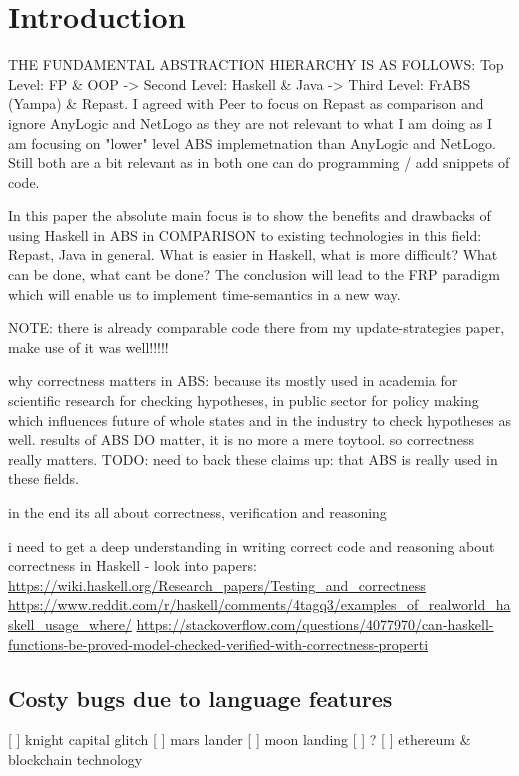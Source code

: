 \section{Introduction}

THE FUNDAMENTAL ABSTRACTION HIERARCHY IS AS FOLLOWS:
Top Level: FP \& OOP -> Second Level: Haskell \& Java -> Third Level: FrABS (Yampa) \& Repast.
I agreed with Peer to focus on Repast as comparison and ignore AnyLogic and NetLogo as they are not relevant to what I am doing as I am focusing on "lower" level ABS implemetnation than AnyLogic and NetLogo. Still both are a bit relevant as in both one can do programming / add snippets of code.


In this paper the absolute main focus is to show the benefits and drawbacks of using Haskell in ABS in COMPARISON to existing technologies in this field: Repast, Java in general. What is easier in Haskell, what is more difficult? What can be done, what cant be done?
The conclusion will lead to the FRP paradigm which will enable us to implement time-semantics in a new way.

NOTE: there is already comparable code there from my update-strategies paper, make use of it was well!!!!! 

why correctness matters in ABS: because its mostly used in academia for scientific research for checking hypotheses, in public sector for policy making which influences future of whole states and in the industry to check hypotheses as well. results of ABS DO matter, it is no more a mere toytool. so correctness really matters. TODO: need to back these claims up: that ABS is really used in these fields.

in the end its all about correctness, verification and reasoning
 
i need to get a deep understanding in writing correct code and reasoning about correctness in Haskell - look into papers:
\url{https://wiki.haskell.org/Research_papers/Testing_and_correctness}
\url{https://www.reddit.com/r/haskell/comments/4tagq3/examples_of_realworld_haskell_usage_where/}
\url{https://stackoverflow.com/questions/4077970/can-haskell-functions-be-proved-model-checked-verified-with-correctness-properti}

\subsection{Costy bugs due to language features}
[ ] knight capital glitch
[ ] mars lander
[ ] moon landing
[ ] ?
[ ] ethereum \& blockchain technology

